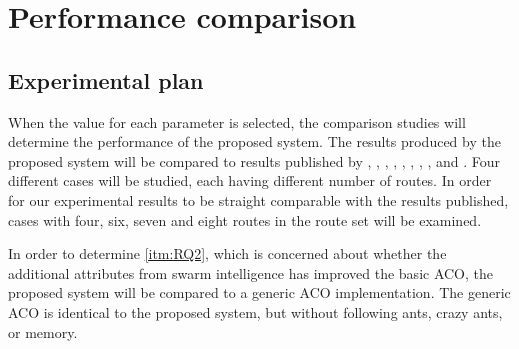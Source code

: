 \section{Performance comparison}
\label{sec:performanceComparison}
\subsection{Experimental plan}
When the value for each parameter is selected, the comparison studies will determine the performance of the proposed system. The results produced by the proposed system will be compared to results published by \citet{mandl79}, \citet{kechagiopoulos14}, \citet{nikolic14}, \citet{kidwai98}, \citet{fan10}, \citet{chakroborty02}, \citet{zhang10}, \citet{chew12}, and \citet{baaj91}. Four different cases will be studied, each having different number of routes. In order for our experimental results to be straight comparable with the results published, cases with four, six, seven and eight routes in the route set will be examined.

In order to determine \vref{itm:RQ2}, which is concerned about whether the additional attributes from swarm intelligence has improved the basic ACO, the proposed system will be compared to a generic ACO implementation. The generic ACO is identical to the proposed system, but without following ants, crazy ants, or memory. 

